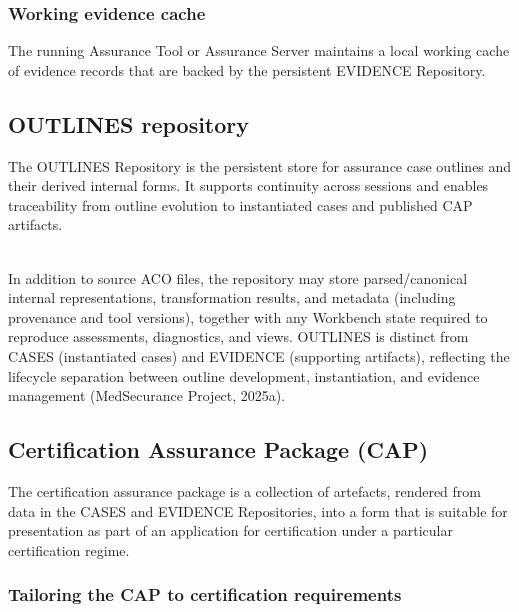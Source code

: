 \documentclass[12pt,twoside,a4paper]{article}
\begin{document}
\hypertarget{working-evidence-cache}{%
\subsubsection{Working evidence cache}\label{working-evidence-cache}}

The running Assurance Tool or Assurance Server maintains a local working cache of evidence records that are backed by the persistent EVIDENCE Repository.

\hypertarget{outlines-repository}{%
\subsection{OUTLINES repository}\label{outlines-repository}}

\protect\hypertarget{_Toc217342243}{}{}The OUTLINES Repository is the persistent store for assurance case outlines and their derived internal forms. It supports continuity across sessions and enables traceability from outline evolution to instantiated cases and published CAP artifacts.\\
\strut \\
In addition to source ACO files, the repository may store parsed/canonical internal representations, transformation results, and metadata (including provenance and tool versions), together with any Workbench state required to reproduce assessments, diagnostics, and views. OUTLINES is distinct from CASES (instantiated cases) and EVIDENCE (supporting artifacts), reflecting the lifecycle separation between outline development, instantiation, and evidence management (MedSecurance Project, 2025a).

\hypertarget{certification-assurance-package-cap}{%
\subsection{Certification Assurance Package (CAP)}\label{certification-assurance-package-cap}}

The certification assurance package is a collection of artefacts, rendered from data in the CASES and EVIDENCE Repositories, into a form that is suitable for presentation as part of an application for certification under a particular certification regime.

\hypertarget{tailoring-the-cap-to-certification-requirements}{%
\subsubsection{Tailoring the CAP to certification requirements}\label{tailoring-the-cap-to-certification-requirements}}
\end{document}
